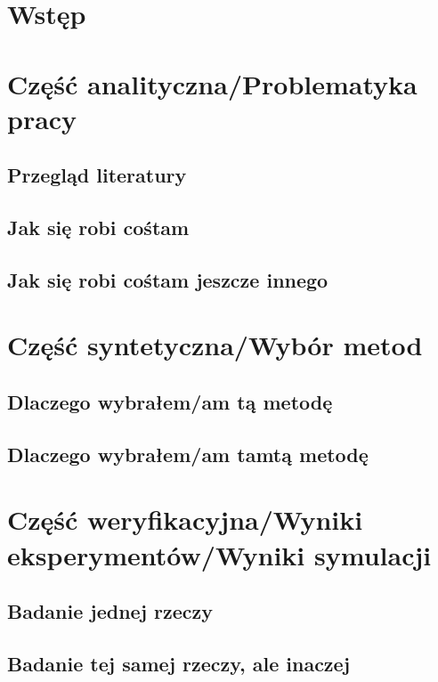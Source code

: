 
\graphicspath{{images/}}




\tableofcontents
\thispagestyle{empty}
\thesisstyle
\newpage 

\section[Wstęp]{Wstęp}
\lipsum[1-5]

\section[Część analityczna]{Część analityczna/Problematyka pracy}
\subsection{Przegląd literatury}
\lipsum[1-3]
\subsection{Jak się robi cośtam}
\lipsum[1-3]
\subsection{Jak się robi cośtam jeszcze innego}
\lipsum[1-2]

\newpage
\section[Część syntetyczna]{Część syntetyczna/Wybór metod}
\subsection{Dlaczego wybrałem/am tą metodę}
\lipsum[1-3]
\subsection{Dlaczego wybrałem/am tamtą metodę}
\lipsum[1-3]

\newpage
\section[Część weryfikacyjna]{Część weryfikacyjna/Wyniki eksperymentów/Wyniki symulacji}
\subsection{Badanie jednej rzeczy}
\lipsum[1-3]
\subsection{Badanie tej samej rzeczy, ale inaczej}
\lipsum[1-3]
